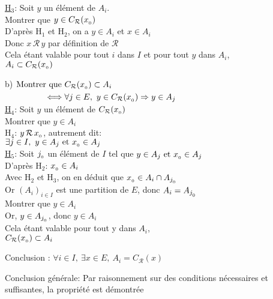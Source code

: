\documentclass[12pt,twoside,a4paper]{article}
\begin{document}
\begin{preuve}
\begin{liste}
\begin{liste}
							\underline{H$_3$}: Soit $y$ un \'el\'ement de $A_i$.\\
							Montrer que $y\in C_\mathcal{R}(x_{_{0}})$\\
							D'apr\`es H$_1$ et H$_2$, on a $y\in A_i$ et $x\in A_i$\\
							Donc $x\,\mathcal{R}\,y$ par d\'efinition de $\mathcal{R}$\\
							Cela \'etant valable pour tout $i$ dans $I$ et pour tout $y$ dans $A_i$, \\
							$A_i\subset C_\mathcal{R}(x_{_{0}})$
						\item[b)] $\begin{aligned}[t]\text{Montrer que }& C_\mathcal{R}(x_{_{0}})\subset A_i\\
							\iff& \forall j\in E,\ y\in C_\mathcal{R}(x_{_{0}})\Rightarrow y\in A_j\end{aligned}$\\
							\underline{H$_4$}: Soit $y$ un \'el\'ement de $C_\mathcal{R}(x_{_{0}})$\\
							Montrer que $y\in A_i$\\
							H$_4$: $y\,\mathcal{R}\,x_{_{0}}$, autrement dit:\\
							$\exists j\in I,\ y\in A_j\text{ et }x_{_{0}}\in A_j$\\
							\underline{H$_5$}: Soit $j_{_{0}}$ un \'el\'ement de $I$ tel que $y\in A_j\text{ et }x_{_{0}}\in A_j$\\
							D'apr\`es H$_2$: $x_{_{0}}\in A_i$\\
							Avec H$_2$ et H$_3$, on en d\'eduit que $x_{_{0}}\in A_i\cap A_{j_{_{0}}}$\\
							Or $(A_i)_{i\in I}$ est une partition de $E$, donc $A_i=A_{j_{_{0}}}$\\
							Montrer que $y\in A_i$\\
							Or, $y\in A_{j_{_{0}}}$, donc $y\in A_i$\\
							Cela \'etant valable pour tout y dans $A_i$,\\
							$ C_\mathcal{R}(x_{_{0}})\subset A_i$
					\end{liste}
				Conclusion : $\forall i\in I,\ \exists x\in E,\ A_i=C_\mathcal{R}(x)$
			\end{liste}
			Conclusion g\'en\'erale: Par raisonnement sur des conditions n\'ecessaires et suffisantes, la propri\'et\'e est d\'emontr\'ee
		\end{preuve}
\end{document}
